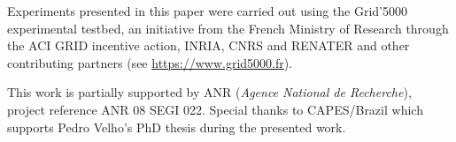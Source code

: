 \documentclass{sig-alternate}
\begin{document}
Experiments presented in this paper were carried out using the
Grid'5000 experimental testbed, an initiative from the French
Ministry of Research through the ACI GRID incentive action, INRIA,
CNRS and RENATER and other contributing partners (see \url{https://www.grid5000.fr}).

This work is partially supported by ANR ({\it Agence National de
  Recherche}), project reference ANR 08 SEGI 022. Special thanks to
CAPES/Brazil which supports Pedro Velho's PhD thesis 
during the presented work.  





\end{document}
